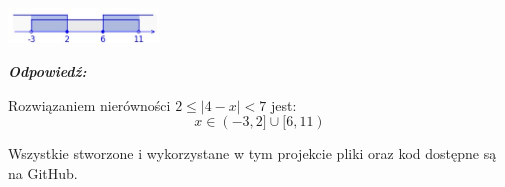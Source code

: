 \documentclass[12pt, a4paper]{report}
\begin{document}
    \bigskip

    \begin{center}
        \includegraphics[width=0.3\textwidth]{fig_8.jpg}
    \end{center}

    \vspace{20pt}                            %
    \noindent
    \emph{\textbf{Odpowiedź:}}

    Rozwiązaniem nierówności $2 \leq |4 - x| < 7$ jest:
    \[x \in (-3, 2] \cup [6, 11)\]

    \vspace{150pt}                            %
    \noindent
    \begin{center}
    Wszystkie stworzone i wykorzystane w tym projekcie pliki oraz kod dostępne są na GitHub.
    \end{center}
\end{document}

